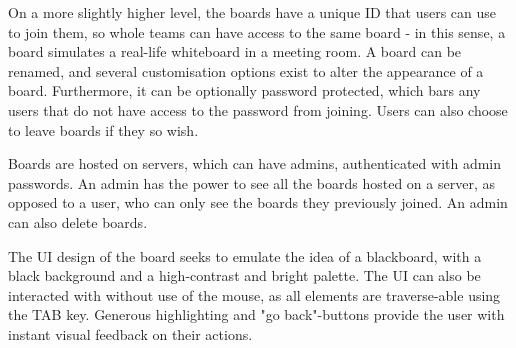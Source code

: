 On a more slightly higher level, the boards have a unique ID that users can use to join them, so whole teams can have access to the same board - in this sense, a board simulates a real-life whiteboard in a meeting room. A board can be renamed, and several customisation options exist to alter the appearance of a board. Furthermore, it can be optionally password protected, which bars any users that do not have access to the password from joining. Users can also choose to leave boards if they so wish.

Boards are hosted on servers, which can have admins, authenticated with admin passwords. An admin has the power to see all the boards hosted on a server, as opposed to a user, who can only see the boards they previously joined. An admin can also delete boards.

The UI design of the board seeks to emulate the idea of a blackboard, with a black background and a high-contrast and bright palette. The UI can also be interacted with without use of the mouse, as all elements are traverse-able using the TAB key. Generous highlighting and "go back"-buttons provide the user with instant visual feedback on their actions.
